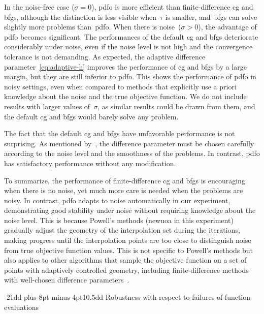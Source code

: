 \documentclass[
    smallextended,  %
    final,          %
]{svjour3}
\makeatletter
\def\subsection{\@startsection{subsection}{2}{\z@}%
    {-21dd plus-8pt minus-4pt}{10.5dd}
    {\sffamily\normalsize\bfseries}}
\newcommand{\modified}[1]{\texorpdfstring{{\color{RoyalBlue}#1}}{#1}}
\makeatother
\begin{document}
In the noise-free case ($\sigma = 0$), \gls{pdfo} is more efficient than finite-difference \gls{cg} and \gls{bfgs}, although the distinction is less visible when~$\tau$ is smaller, and~\gls{bfgs} can solve slightly more problems than~\gls{pdfo}.
When there is noise~($\sigma >0$), the advantage of \gls{pdfo} becomes significant.
The performances of \modified{the default} \gls{cg} and \gls{bfgs} deteriorate considerably under noise, even if the noise level is not high and the convergence tolerance is not demanding.
\modified{
    As expected, the adaptive difference parameter~\eqref{eq:adaptive-h} improves the performance of \gls{cg} and \gls{bfgs} by a large margin, but they are still inferior to \gls{pdfo}.
    This shows the performance of \gls{pdfo} in noisy settings, even when compared to methods that explicitly use a priori knowledge about the noise and the true objective function.
}
We do not include results with larger values of~$\sigma$, as \modified{similar results could be drawn from them, and the default \gls{cg} and \gls{bfgs} would barely solve any problem}.

\modified{
    The fact that the default \gls{cg} and \gls{bfgs} have unfavorable performance is not surprising.
    As mentioned by~\cite{Shi_Etal_2022a,Shi_Etal_2023}, the difference parameter must be chosen carefully according to the noise level and the smoothness of the problems.
    In contrast, \gls{pdfo} has satisfactory performance without any modification.
}

To summarize, the performance of finite-difference \gls{cg} and \gls{bfgs} is encouraging when there is no noise, yet much more care is needed when the problems are noisy.
In contrast, \gls{pdfo} adapts to noise automatically in our experiment, demonstrating good stability under noise without requiring knowledge about the noise level.
This is because Powell's methods (\gls{newuoa} in this experiment) gradually adjust the geometry of the interpolation set during the iterations, making progress until the interpolation points are too close to distinguish noise from true objective function values.
This is not specific to Powell's methods but also applies to other algorithms that sample the objective function on a set of points with adaptively controlled geometry, including finite-difference methods with well-chosen difference parameters~\cite{Shi_Etal_2022a}.

\subsection{Robustness with respect to failures of function evaluations}
\label{ssec:nan}
\end{document}
